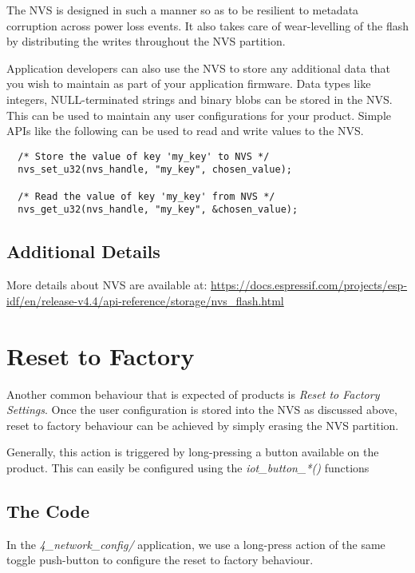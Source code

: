 \documentclass[main.tex]{subfiles}
\begin{document}
The NVS is designed in such a manner so as to be resilient to metadata corruption across power loss events. It also takes care of wear-levelling of the flash by distributing the writes throughout the NVS partition.

Application developers can also use the NVS to store any additional data that you wish to maintain as part of your application firmware. Data types like integers, NULL-terminated strings and binary blobs can be stored in the NVS. This can be used to maintain any user configurations for your product. Simple APIs like the following can be used to read and write values to the NVS.

\begin{verbatim}
  /* Store the value of key 'my_key' to NVS */
  nvs_set_u32(nvs_handle, "my_key", chosen_value);

  /* Read the value of key 'my_key' from NVS */
  nvs_get_u32(nvs_handle, "my_key", &chosen_value);
\end{verbatim}


\subsection{Additional Details}

More details about NVS are available at: \url{https://docs.espressif.com/projects/esp-idf/en/release-v4.4/api-reference/storage/nvs_flash.html}

\section{Reset to Factory}
Another common behaviour that is expected of products is \textit{Reset to Factory Settings}. Once the user configuration is stored into the NVS as discussed above, reset to factory behaviour can be achieved by simply erasing the NVS partition.

Generally, this action is triggered by long-pressing a button available on the product. This can easily be configured using the \textit{iot\_button\_*()} functions

\subsection{The Code}\label{sec:reset_to_factory}
In the \textit{4\_network\_config/} application, we use a long-press action of the same toggle push-button to configure the reset to factory behaviour.
\end{document}
